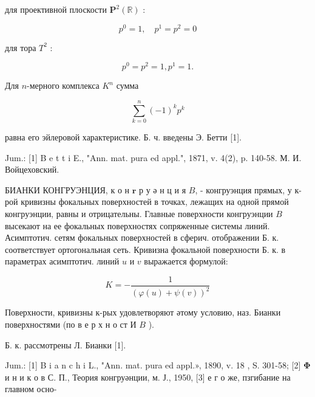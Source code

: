 \documentclass[10pt]{article}
\begin{document}
для проективной плоскости $\boldsymbol{P}^{2}(\mathbb{R})$ :



\[

p^{0}=1, \quad p^{1}=p^{2}=0

\]



для тора $T^{2}$ :



\[

p^{0}=p^{2}=1, p^{1}=1 .

\]



Для $n$-мерного комплекса $K^{n}$ сумма



\[

\sum_{k=0}^{n}(-1)^{k} p^{k}

\]



равна его эйлеровой характеристике. Б. ч. введены Э. Бетти [1].



Jum.: [1] B e t t i E., "Ann. mat. pura ed appl.", 1871, v. 4(2), p. 140-58. М. И. Войцеховский.



БИАНКИ КОНГРУЭНЦИЯ, к о н $\boldsymbol{r}$ р у ә н ц и я $B$, - конгруэнция прямых, у к-рой кривизны фокальных поверхностей в точках, лежащих на одной прямой конгруэнции, равны и отрицательны. Главные поверхности конгруэнции $B$ высекают на ее фокальных поверхностях сопряженные системы линий. Асимптотич. сетям фокальных поверхностей в сферич. отображении Б. к. соответствует ортогональная сеть. Кривизна фокальной поверхности Б. к. в параметрах асимптотич. линий $u$ и $v$ выражается формулой:



\[

K=-\frac{1}{(\varphi(u)+\psi(v))^{2}}

\]



Поверхности, кривизны к-рых удовлетворяют әтому условию, наз. Бианки поверхностями (по в е р х н о ст И $B$ ).



Б. к. рассмотрены Л. Бианки [1].



Jum.: [1] B i a n c h i L., "Ann. mat. pura ed appl.», 1890, v. 18 , S. 301-58; [2] $\boldsymbol{\Phi}$ и н и к о в С. П., Теория конгруәнции, м. Ј., 1950, [3] е г о же, пзгибание на главном осно-
\end{document}

